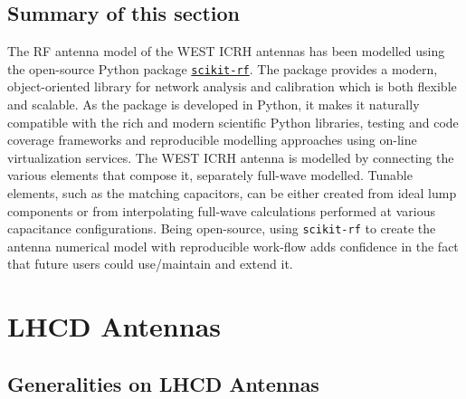 \subsection{Summary of this section}


The RF antenna model of the WEST ICRH antennas has been modelled using the open-source Python package \href{http://scikit-rf.org/}{\texttt{scikit-rf}}. The package provides a modern, object-oriented library for network analysis and calibration which is both flexible and scalable. As the package is developed in Python, it makes it naturally compatible with the rich and modern scientific Python libraries, testing and code coverage frameworks and reproducible modelling approaches using on-line virtualization services. The WEST ICRH antenna is modelled by connecting the various elements that compose it, separately full-wave modelled. Tunable elements, such as the matching capacitors, can be either created from ideal lump components or from interpolating full-wave calculations performed at various capacitance configurations. Being open-source, using \texttt{scikit-rf} to create the antenna numerical model with reproducible work-flow adds confidence in the fact that future users could use/maintain and extend it.


\section{LHCD Antennas}\label{sec:LHCD_antennas}
\subsection{Generalities on LHCD Antennas}
